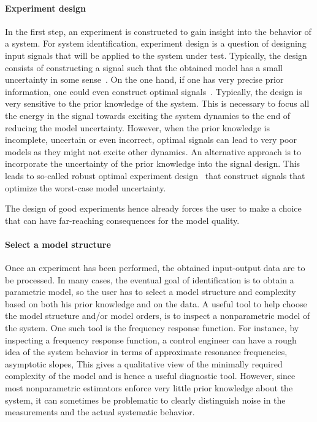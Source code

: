 \paragraph{Experiment design}
In the first step, an experiment is constructed to gain insight into the behavior of a system.
For system identification, experiment design is a question of designing input signals that will be applied to the system under test.
Typically, the design consists of constructing a signal such that the obtained model  has a small uncertainty in some sense~\citep{Goodwin1977,Mehra1974,Goodwin2006GBO,Levadi1966}.
On the one hand, if one has very precise prior information, one could even construct optimal signals~\citep{Gagliardi1967,Karlin1966,Gevers2011ExpDesign,Zarrop1979}.
Typically, the design is very sensitive to the prior knowledge of the system.
This is necessary to focus all the energy in the signal towards exciting the system dynamics to the end of reducing the model uncertainty.
However, when the prior knowledge is incomplete, uncertain or even incorrect, optimal signals can lead to very poor models as they might not excite other dynamics.
An alternative approach is to incorporate the uncertainty of the prior knowledge into the signal design.
This leads to so-called robust optimal experiment design~\citep{Rojas2012,Goodwin2006} that construct signals that optimize the worst-case model uncertainty.

The design of good experiments hence already forces the user to make a choice that can have far-reaching consequences for the model quality.

\paragraph{Select a model structure}
Once an experiment has been performed, the obtained input-output data are to be processed.
In many cases, the eventual goal of identification is to obtain a parametric model, so the user has to select a model structure and complexity based on both his prior knowledge and on the data.
A useful tool to help choose the model structure and/or model orders, is to inspect a nonparametric model of the system.
One such tool is the frequency response function.
For instance, by inspecting a frequency response function, a control engineer can have a rough idea of the system behavior in terms of  approximate resonance frequencies, asymptotic slopes, 
This gives a qualitative view of the minimally required complexity of the model and is hence a useful diagnostic tool.
However, since most nonparametric estimators enforce very little prior knowledge about the system, it can sometimes be problematic to clearly distinguish noise in the measurements and the actual systematic behavior.

